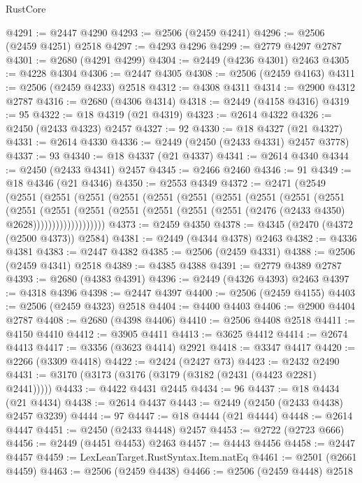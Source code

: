 \begin{lexlean}{RustCore}
\begin{coremodule}
@4291 := @2447 @4290
@4293 := @2506 (@2459 @4241)
@4296 := @2506 (@2459 @4251) @2518
@4297 := @4293 @4296
@4299 := @2779 @4297 @2787
@4301 := @2680 (@4291 @4299)
@4304 := @2449 (@4236 @4301) @2463
@4305 := @4228 @4304
@4306 := @2447 @4305
@4308 := @2506 (@2459 @4163)
@4311 := @2506 (@2459 @4233) @2518
@4312 := @4308 @4311
@4314 := @2900 @4312 @2787
@4316 := @2680 (@4306 @4314)
@4318 := @2449 (@4158 @4316)
@4319 := 95
@4322 := @18 @4319 (@21 @4319)
@4323 := @2614 @4322
@4326 := @2450 (@2433 @4323) @2457
@4327 := 92
@4330 := @18 @4327 (@21 @4327)
@4331 := @2614 @4330
@4336 := @2449 (@2450 (@2433 @4331) @2457 @3778)
@4337 := 93
@4340 := @18 @4337 (@21 @4337)
@4341 := @2614 @4340
@4344 := @2450 (@2433 @4341) @2457
@4345 := @2466 @2460
@4346 := 91
@4349 := @18 @4346 (@21 @4346)
@4350 := @2553 @4349
@4372 := @2471
    (@2549
      (@2551
        (@2551
          (@2551
            (@2551
              (@2551
                (@2551
                  (@2551
                    (@2551
                      (@2551
                        (@2551
                          (@2551
                            (@2551
                              (@2551
                                (@2551
                                  (@2551 (@2551 (@2551 (@2476 (@2433 @4350) @2628)))))))))))))))))))
@4373 := @2459 @4350
@4378 := @4345 (@2470 (@4372 (@2500 @4373)) @2584)
@4381 := @2449 (@4344 @4378) @2463
@4382 := @4336 @4381
@4383 := @2447 @4382
@4385 := @2506 (@2459 @4331)
@4388 := @2506 (@2459 @4341) @2518
@4389 := @4385 @4388
@4391 := @2779 @4389 @2787
@4393 := @2680 (@4383 @4391)
@4396 := @2449 (@4326 @4393) @2463
@4397 := @4318 @4396
@4398 := @2447 @4397
@4400 := @2506 (@2459 @4155)
@4403 := @2506 (@2459 @4323) @2518
@4404 := @4400 @4403
@4406 := @2900 @4404 @2787
@4408 := @2680 (@4398 @4406)
@4410 := @2506 @4408 @2518
@4411 := @4150 @4410
@4412 := @3905 @4411
@4413 := @3625 @4412
@4414 := @2674 @4413
@4417 := @3356 (@3623 @4414) @2921
@4418 := @3347 @4417
@4420 := @2266 (@3309 @4418)
@4422 := @2424 (@2427 @73)
@4423 := @2432 @2490
@4431 := @3170 (@3173 (@3176 (@3179 (@3182 (@2431 (@4423 @2281) @2441)))))
@4433 := @4422 @4431 @2445
@4434 := 96
@4437 := @18 @4434 (@21 @4434)
@4438 := @2614 @4437
@4443 := @2449 (@2450 (@2433 @4438) @2457 @3239)
@4444 := 97
@4447 := @18 @4444 (@21 @4444)
@4448 := @2614 @4447
@4451 := @2450 (@2433 @4448) @2457
@4453 := @2722 (@2723 @666)
@4456 := @2449 (@4451 @4453) @2463
@4457 := @4443 @4456
@4458 := @2447 @4457
@4459 := LexLeanTarget.RustSyntax.Item.natEq
@4461 := @2501 (@2661 @4459)
@4463 := @2506 (@2459 @4438)
@4466 := @2506 (@2459 @4448) @2518

\end{coremodule}
\end{lexlean}
